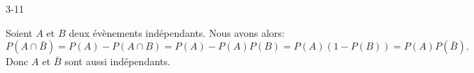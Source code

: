 \begin{corrige}{3-11}

Soient $A$ et $B$ deux évènements indépendants. Nous avons alors:
\[
 P(A \cap \bar{B}) = P(A) - P(A \cap B) = P(A) - P(A)P(B) = P(A) (1 - P(B)) = P(A)P(\bar{B}).
\]
Donc $A$ et $\bar{B}$ sont aussi indépendants.

\end{corrige}

